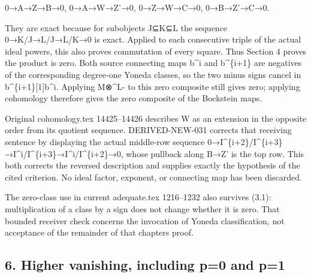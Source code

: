 \documentclass[11pt]{article}
\begin{document}
0\allowbreak{}→A\allowbreak{}→Z\allowbreak{}→B\allowbreak{}→0,\allowbreak{} 0\allowbreak{}→A\allowbreak{}→W\allowbreak{}→Z'\allowbreak{}→0,\allowbreak{} 0\allowbreak{}→Z\allowbreak{}→W\allowbreak{}→C\allowbreak{}→0,\allowbreak{} 0\allowbreak{}→B\allowbreak{}→Z'\allowbreak{}→C\allowbreak{}→0.

They are exact because for subobjects J⊆K⊆L the sequence 0\allowbreak{}→K/\allowbreak{}J\allowbreak{}→L/\allowbreak{}J\allowbreak{}→L/\allowbreak{}K\allowbreak{}→0 is exact. Applied to each consecutive triple of the actual ideal powers,\allowbreak{} this also proves commutation of every square. Thus Section 4 proves the product is zero. Both source connecting maps b\^{}i and b\textasciicircum{}\{i\allowbreak{}+1\} are negatives of the corresponding degree-one Yoneda classes,\allowbreak{} so the two minus signs cancel in b\textasciicircum{}\{i\allowbreak{}+1\}[1]\allowbreak{}b\textasciicircum{}i. Applying M⊗\^{}L- to this zero composite still gives zero; applying cohomology therefore gives the zero composite of the Bockstein maps.

Original cohomology.tex 14425–\allowbreak{}14426 describes W as an extension in the opposite order from its quotient sequence. DERIVED-NEW-031 corrects that receiving sentence by displaying the actual middle-row sequence 0\allowbreak{}→I\textasciicircum{}\{i\allowbreak{}+2\}/\allowbreak{}I\textasciicircum{}\{i\allowbreak{}+3\}\allowbreak{}→I\textasciicircum{}i/\allowbreak{}I\textasciicircum{}\{i\allowbreak{}+3\}\allowbreak{}→I\textasciicircum{}i/\allowbreak{}I\textasciicircum{}\{i\allowbreak{}+2\}\allowbreak{}→0,\allowbreak{} whose pullback along B\allowbreak{}→Z' is the top row. This both corrects the reversed description and supplies exactly the hypothesis of the cited criterion. No ideal factor,\allowbreak{} exponent,\allowbreak{} or connecting map has been discarded.

The zero-class use in current adequate.tex 1216–\allowbreak{}1232 also survives (3.1)\allowbreak{}:\allowbreak{} multiplication of a class by a sign does not change whether it is zero. That bounded receiver check concerns the invocation of Yoneda classification,\allowbreak{} not acceptance of the remainder of that chapter\textquotesingle s proof.

\subsection{\texorpdfstring{6. Higher vanishing,\allowbreak{} including p\allowbreak{}=0 and p\allowbreak{}=1}{6. Higher  including  and }}\label{proofs-8774-9196-higher-vanishing-including-p0-and-p1}
\end{document}
